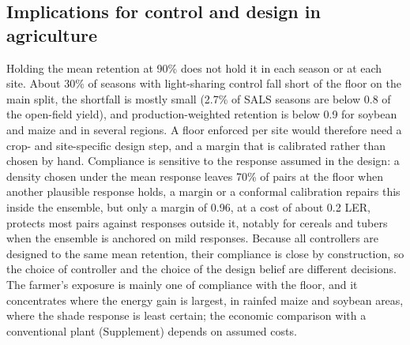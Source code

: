 \subsection{Implications for control and design in agriculture}
Holding the mean retention at 90\% does not hold it in each season or at each site. About 30\% of seasons with light-sharing control fall short of the floor on the main split, the shortfall is mostly small (2.7\% of SALS seasons are below 0.8 of the open-field yield), and production-weighted retention is below 0.9 for soybean and maize and in several regions. A floor enforced per site would therefore need a crop- and site-specific design step, and a margin that is calibrated rather than chosen by hand. Compliance is sensitive to the response assumed in the design: a density chosen under the mean response leaves 70\% of pairs at the floor when another plausible response holds, a margin or a conformal calibration repairs this inside the ensemble, but only a margin of 0.96, at a cost of about 0.2 LER, protects most pairs against responses outside it, notably for cereals and tubers when the ensemble is anchored on mild responses. Because all controllers are designed to the same mean retention, their compliance is close by construction, so the choice of controller and the choice of the design belief are different decisions. The farmer's exposure is mainly one of compliance with the floor, and it concentrates where the energy gain is largest, in rainfed maize and soybean areas, where the shade response is least certain; the economic comparison with a conventional plant (Supplement) depends on assumed costs.

